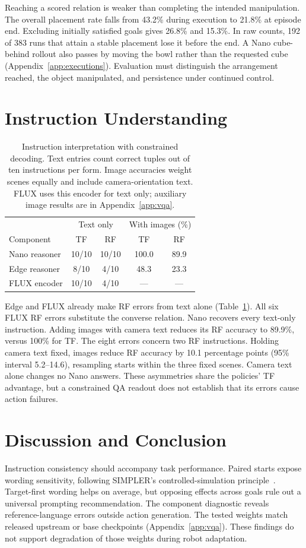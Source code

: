 \documentclass{article}
\begin{document}
Reaching a scored relation is weaker than completing the intended manipulation. The overall placement rate falls from 43.2\% during execution to 21.8\% at episode end. Excluding initially satisfied goals gives 26.8\% and 15.3\%. In raw counts, 192 of 383 runs that attain a stable placement lose it before the end. A Nano cube-behind rollout also passes by moving the bowl rather than the requested cube (Appendix~\ref{app:executions}). Evaluation must distinguish the arrangement reached, the object manipulated, and persistence under continued control.

\FloatBarrier
\section{Instruction Understanding}
\begin{table}[!ht]
\centering\small
\caption{Instruction interpretation with constrained decoding. Text entries count correct tuples out of ten instructions per form. Image accuracies weight scenes equally and include camera-orientation text. FLUX uses this encoder for text only; auxiliary image results are in Appendix~\ref{app:vqa}.}
\label{tab:vqa}
\begin{tabular}{@{}lcc@{\qquad}cc@{}}
\toprule
& \multicolumn{2}{c}{Text only} & \multicolumn{2}{c}{With images (\%)}\\
Component & TF & RF & TF & RF\\
\midrule
Nano reasoner & 10/10 & 10/10 & 100.0 & 89.9\\
Edge reasoner & 8/10 & 4/10 & 48.3 & 23.3\\
FLUX encoder & 10/10 & 4/10 & --- & ---\\
\bottomrule
\end{tabular}
\end{table}

Edge and FLUX already make RF errors from text alone (Table~\ref{tab:vqa}). All six FLUX RF errors substitute the converse relation. Nano recovers every text-only instruction. Adding images with camera text reduces its RF accuracy to 89.9\%, versus 100\% for TF. The eight errors concern two RF instructions. Holding camera text fixed, images reduce RF accuracy by 10.1 percentage points (95\% interval 5.2--14.6), resampling starts within the three fixed scenes. Camera text alone changes no Nano answers. These asymmetries share the policies' TF advantage, but a constrained QA readout does not establish that its errors cause action failures.

\section{Discussion and Conclusion}
Instruction consistency should accompany task performance. Paired starts expose wording sensitivity, following SIMPLER's controlled-simulation principle~\citep{li2025simpler}. Target-first wording helps on average, but opposing effects across goals rule out a universal prompting recommendation. The component diagnostic reveals reference-language errors outside action generation. The tested weights match released upstream or base checkpoints (Appendix~\ref{app:vqa}). These findings do not support degradation of those weights during robot adaptation.
\end{document}
